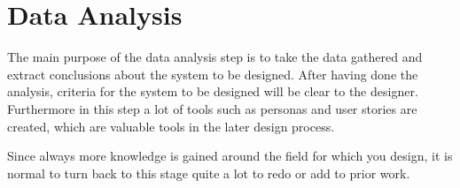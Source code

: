 \section{Data Analysis} \label{sec:1_data_analysis}
The main purpose of the data analysis step is to take the data gathered and
extract conclusions about the system to be designed. After having done the
analysis, criteria for the system to be designed will be clear to the designer.
Furthermore in this step a lot of tools such as personas and user stories are
created, which are valuable tools in the later design process.

Since always more knowledge is gained around the field for which you design, it
is normal to turn back to this stage quite a lot to redo or add to prior work.





